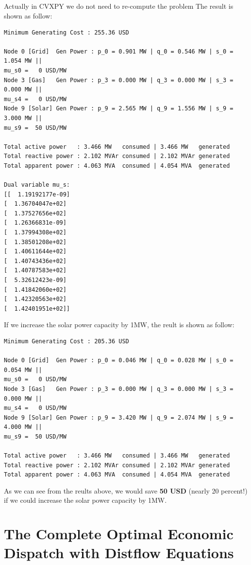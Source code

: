 \documentclass[12pt]{article}
\begin{document}
\subsection{} 
Actually in CVXPY we do not need to re-compute the problem
The result is shown as follow:
\begin{verbatim}
Minimum Generating Cost : 255.36 USD

Node 0 [Grid]  Gen Power : p_0 = 0.901 MW | q_0 = 0.546 MW | s_0 = 1.054 MW || 
mu_s0 =   0 USD/MW
Node 3 [Gas]   Gen Power : p_3 = 0.000 MW | q_3 = 0.000 MW | s_3 = 0.000 MW || 
mu_s4 =   0 USD/MW
Node 9 [Solar] Gen Power : p_9 = 2.565 MW | q_9 = 1.556 MW | s_9 = 3.000 MW || 
mu_s9 =  50 USD/MW

Total active power   : 3.466 MW   consumed | 3.466 MW   generated
Total reactive power : 2.102 MVAr consumed | 2.102 MVAr generated
Total apparent power : 4.063 MVA  consumed | 4.054 MVA  generated

Dual variable mu_s:
[[  1.19192177e-09]
[  1.36704047e+02]
[  1.37527656e+02]
[  1.26366831e-09]
[  1.37994308e+02]
[  1.38501208e+02]
[  1.40611644e+02]
[  1.40743436e+02]
[  1.40787583e+02]
[  5.32612423e-09]
[  1.41842060e+02]
[  1.42320563e+02]
[  1.42401951e+02]]
\end{verbatim}
If we increase the solar power capacity by 1MW, the reult is shown as follow:
\begin{verbatim}
Minimum Generating Cost : 205.36 USD

Node 0 [Grid]  Gen Power : p_0 = 0.046 MW | q_0 = 0.028 MW | s_0 = 0.054 MW || 
mu_s0 =   0 USD/MW
Node 3 [Gas]   Gen Power : p_3 = 0.000 MW | q_3 = 0.000 MW | s_3 = 0.000 MW || 
mu_s4 =   0 USD/MW
Node 9 [Solar] Gen Power : p_9 = 3.420 MW | q_9 = 2.074 MW | s_9 = 4.000 MW || 
mu_s9 =  50 USD/MW

Total active power   : 3.466 MW   consumed | 3.466 MW   generated
Total reactive power : 2.102 MVAr consumed | 2.102 MVAr generated
Total apparent power : 4.063 MVA  consumed | 4.054 MVA  generated
\end{verbatim}
As we can see from the reults above, we would save \textbf{50 USD} (nearly 20 percent!) if we could increase the solar power capacity by 1MW.
\section{The Complete Optimal Economic Dispatch with Distflow Equations}
\end{document}
